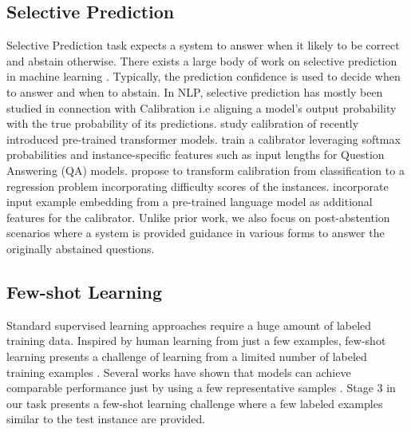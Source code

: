 \documentclass[11pt,a4paper]{article}
\begin{document}
\subsection{Selective Prediction}
Selective Prediction task expects a system to answer when it likely to be correct and abstain otherwise.
There exists a large body of work on selective prediction in machine learning \cite{chow1957optimum,el2010foundations,geifman2017selective}.
Typically, the prediction confidence is used to decide when to answer and when to abstain.
In NLP, selective prediction has mostly been studied in connection with Calibration \cite{platt1999probabilistic} i.e aligning a model's output probability with the true probability of its predictions. 
\citet{desai-durrett-2020-calibration} study calibration of recently introduced pre-trained transformer models.
\citet{kamath-etal-2020-selective} train a calibrator leveraging softmax probabilities and instance-specific features such as input lengths for Question Answering (QA) models. 
\citet{varshney2020s} propose to transform calibration from classification to a regression problem incorporating difficulty scores of the instances.
\citet{zhang2021knowing} incorporate input example embedding from a pre-trained language model as additional features for the calibrator.
Unlike prior work, we also focus on post-abstention scenarios where a system is provided guidance in various forms to answer the originally abstained questions.

\subsection{Few-shot Learning}
Standard supervised learning approaches require a huge amount of labeled training data.
Inspired by human learning from just a few examples, few-shot learning presents a challenge of learning from a limited number of labeled training examples \cite{NEURIPS2020_1457c0d6, schick-schutze-2021-just, Ye2021CrossFitAF, Tam2021ImprovingAS}. Several works have shown that models can achieve comparable performance just by using a few representative samples \cite{wang2018dataset, nachum2018data, Mishra2020DoWN,sucholutsky2021less}.
Stage 3 in our task presents a few-shot learning challenge where a few labeled examples similar to the test instance are provided.
\end{document}
